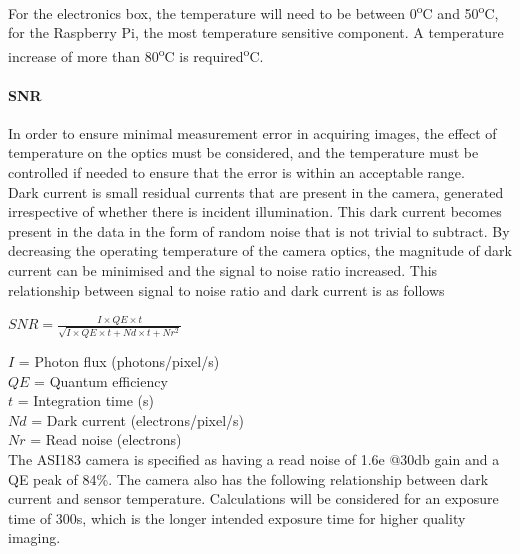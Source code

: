 For the electronics box, the temperature will need to be between 0\textsuperscript{o}C and 50\textsuperscript{o}C, for the Raspberry Pi, the most temperature sensitive component. A temperature increase of more than 80\textsuperscript{o}C is required\textsuperscript{o}C.\\

\paragraph{SNR}

In order to ensure minimal measurement error in acquiring images, the effect of temperature on the optics must be considered, and the temperature must be controlled if needed to ensure that the error is within an acceptable range.\\

Dark current is small residual currents that are present in the camera, generated irrespective of whether there is incident illumination. This dark current becomes present in the data in the form of random noise that is not trivial to subtract. By decreasing the operating temperature of the camera optics, the magnitude of dark current can be minimised and the signal to noise ratio increased. This relationship between signal to noise ratio and dark current is as follows\\

\begin{center}
 $SNR =  \frac{I\times QE\times t}{\sqrt{I\times QE\times t+Nd\times t+Nr^2}}$\\
\end{center}

$I$ = Photon flux (photons/pixel/s)\\
$QE$ = Quantum efficiency\\
$t$ = Integration time (s)\\
$Nd$ = Dark current (electrons/pixel/s)\\
$Nr$ = Read noise (electrons)\\

The ASI183 camera is specified as having a read noise of 1.6e @30db gain and a QE peak of 84\%. The camera also has the following relationship between dark current and sensor temperature. Calculations will be considered for an exposure time of 300s, which is the longer intended exposure time for higher quality imaging.  \\



